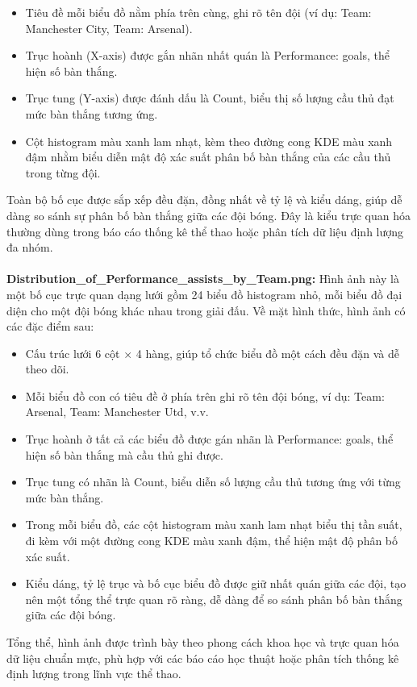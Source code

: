 \documentclass[12pt]{report}
\begin{document}
{\begin{itemize}
	\item Tiêu đề mỗi biểu đồ nằm phía trên cùng, ghi rõ tên đội (ví dụ: Team: Manchester City, Team: Arsenal).
	\item Trục hoành (X-axis) được gắn nhãn nhất quán là Performance: goals, thể hiện số bàn thắng.
	\item Trục tung (Y-axis) được đánh dấu là Count, biểu thị số lượng cầu thủ đạt mức bàn thắng tương ứng.
	\item Cột histogram màu xanh lam nhạt, kèm theo đường cong KDE màu xanh đậm nhằm biểu diễn mật độ xác suất phân bố bàn thắng của các cầu thủ trong từng đội.
\end{itemize}
Toàn bộ bố cục được sắp xếp đều đặn, đồng nhất về tỷ lệ và kiểu dáng, giúp dễ dàng so sánh sự phân bố bàn thắng giữa các đội bóng. Đây là kiểu trực quan hóa thường dùng trong báo cáo thống kê thể thao hoặc phân tích dữ liệu định lượng đa nhóm.
\\\\
\textbf{Distribution\_of\_Performance\_assists\_by\_Team.png:}
Hình ảnh này là một bố cục trực quan dạng lưới gồm 24 biểu đồ histogram nhỏ, mỗi biểu đồ đại diện cho một đội bóng khác nhau trong giải đấu. Về mặt hình thức, hình ảnh có các đặc điểm sau:
\begin{itemize}
	\item Cấu trúc lưới 6 cột × 4 hàng, giúp tổ chức biểu đồ một cách đều đặn và dễ theo dõi.
	\item Mỗi biểu đồ con có tiêu đề ở phía trên ghi rõ tên đội bóng, ví dụ: Team: Arsenal, Team: Manchester Utd, v.v.
	\item Trục hoành ở tất cả các biểu đồ được gán nhãn là Performance: goals, thể hiện số bàn thắng mà cầu thủ ghi được.
	\item Trục tung có nhãn là Count, biểu diễn số lượng cầu thủ tương ứng với từng mức bàn thắng.
	\item Trong mỗi biểu đồ, các cột histogram màu xanh lam nhạt biểu thị tần suất, đi kèm với một đường cong KDE màu xanh đậm, thể hiện mật độ phân bố xác suất.
	\item Kiểu dáng, tỷ lệ trục và bố cục biểu đồ được giữ nhất quán giữa các đội, tạo nên một tổng thể trực quan rõ ràng, dễ dàng để so sánh phân bố bàn thắng giữa các đội bóng.
\end{itemize}
Tổng thể, hình ảnh được trình bày theo phong cách khoa học và trực quan hóa dữ liệu chuẩn mực, phù hợp với các báo cáo học thuật hoặc phân tích thống kê định lượng trong lĩnh vực thể thao.
\\\\
}
\end{document}
